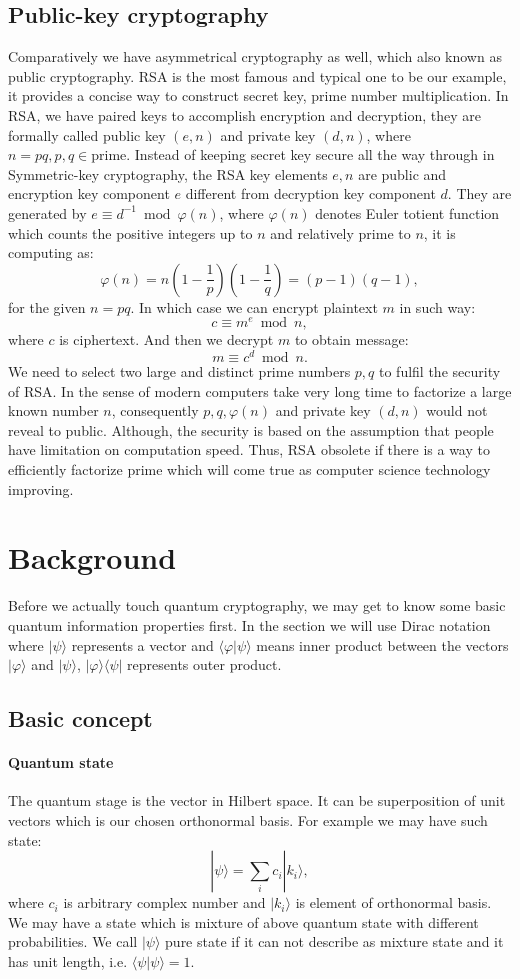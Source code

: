 \documentclass[12pt]{article}
\begin{document}
\subsection{Public-key cryptography}
Comparatively we have asymmetrical cryptography as well, which also known as public cryptography. RSA is the most famous and typical one to be our example, it provides a concise way to construct secret key, prime number multiplication. In RSA, we have paired keys to accomplish encryption and decryption, they are formally called public key $(e,n)$ and private key $(d,n)$, where $n = pq, p,q\in \text{prime}$. Instead of keeping secret key secure all the way through in Symmetric-key cryptography, the RSA key elements $e,n$ are public and encryption key component $e$ different from decryption key component $d$. They are generated by $e\equiv d^{-1} \bmod{\varphi(n)}$, where $\varphi(n)$ denotes Euler totient function which counts the positive integers up to $n$ and relatively prime to $n$, it is computing as:
\[
	\varphi(n)=n(1-\frac{1}{p})(1-\frac{1}{q})=(p-1)(q-1),
\] 
for the given $n=pq$. In which case we can encrypt plaintext $m$ in such way:
\[
	c\equiv m^e\bmod{n},
\]
where $c$ is ciphertext. And then we decrypt $m$ to obtain message:
\[
	m\equiv c^d \bmod {n}.
\]
We need to select two large and distinct prime numbers $p,q$ to fulfil the security of RSA. In the sense of modern computers take very long time to factorize a large known number $n$, consequently $p,q,\varphi(n)$ and private key $(d,n)$ would not reveal to public. Although, the security is based on the assumption that people have limitation on computation speed. Thus, RSA obsolete if there is a way to efficiently factorize prime which will come true as computer science technology improving.
\section{Background}
Before we actually touch quantum cryptography, we may get to know some basic quantum information properties first. In the section we will use Dirac notation where $|\psi \rangle$ represents a vector and $\langle\varphi|\psi\rangle$ means inner product between the vectors $|\varphi\rangle$ and $|\psi\rangle$, $|\varphi\rangle\langle \psi|$ represents outer product.
\subsection{Basic concept}
\paragraph{Quantum state}
The quantum stage is the vector in Hilbert space. It can be superposition of unit vectors which is our chosen orthonormal basis. For example we may have such state:
\[
	|\psi \rangle =\sum_i c_i|k_i\rangle,
\]
where $c_i$ is arbitrary complex number and $|k_i\rangle$ is element of orthonormal basis. We may have a state which is mixture of above quantum state with different probabilities.
We call $|\psi \rangle$ pure state if it can not describe as mixture state and it has unit length, i.e. $\langle \psi|\psi \rangle=1$.
\end{document}
